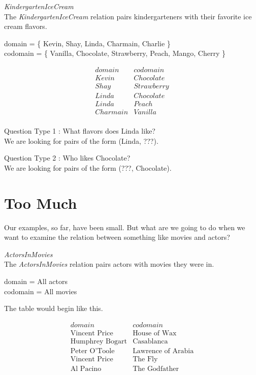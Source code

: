 \documentclass{ximera}
\begin{document}
\begin{example} \textit{KindergartenIceCream} \\
The \textit{KindergartenIceCream} relation pairs kindergarteners with their favorite ice cream flavors.

domain = \{ Kevin, Shay, Linda, Charmain, Charlie \}  \\
codomain = \{ Vanilla, Chocolate, Strawberry, Peach, Mango, Cherry \} 

\[
\begin{array}{l|l}
    domain      & codomain      \\ \hline
    Kevin   &  Chocolate \\
    Shay   & Strawberry \\
    Linda  &  Chocolate \\
    Linda  &  Peach \\
    Charmain &  Vanilla \\ 
\end{array}
\]


Question Type 1 : What flavors does Linda like? \\
We are looking for pairs of the form (Linda, ???).

Question Type 2 : Who likes Chocolate? \\
We are looking for pairs of the form (???, Chocolate).

\end{example} 



\section{Too Much}

Our examples, so far, have been small.  But what are we going to do when we want to examine the relation between something like movies and actors?  


\begin{example} \textit{ActorsInMovies} \\
The \textit{ActorsInMovies} relation pairs actors with movies they were in.

domain = All actors \\
codomain = All movies

The table would begin like this.

\[
\begin{array}{l|l}
    domain      & codomain      \\ \hline
    \text{Vincent Price}   &  \text{House of Wax} \\
    \text{Humphrey Bogart}   & \text{Casablanca} \\
    \text{Peter O'Toole}  &  \text{Lawrence of Arabia} \\
    \text{Vincent Price}  &  \text{The Fly} \\
    \text{Al Pacino} &  \text{The Godfather} \\ 
\end{array}
\]

\end{example} 
\end{document}
